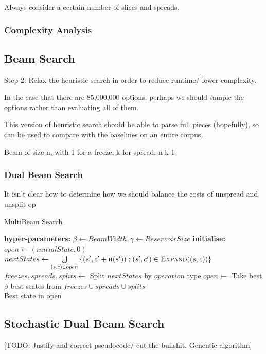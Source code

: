 \documentclass[12pt,a4paper,twoside,openany]{report} \usepackage[pdfborder={0 0 0}]{hyperref}    %
\theoremstyle{definition} \newtheorem{definition}{Definition}[section]
\begin{document}
    Always consider a certain number of slices and spreads.
    \subsubsection{Complexity Analysis}

    \subsection {Beam Search}
    Step 2: Relax the heuristic search in order to reduce runtime/ lower complexity. \par In
    the case that there are 85,000,000 options, perhaps we should sample the options rather than evaluating all of them.
    \par This version of heuristic search should be able to parse full pieces (hopefully), so can be used to compare
    with the baselines on an entire corpus. \par Beam of size n, with 1 for a freeze, k for spread, n-k-1 

    \subsubsection{Dual Beam Search} 
    It isn't clear how to determine how we should balance the costs of unspread and unsplit op

    \begin{algorithm}[ht] 
      \caption{MultiBeam Search} 
      \label{code:mbs} 
      \begin{algorithmic} 
        \State \textbf{hyper-parameters: } $\beta \gets BeamWidth, \gamma \gets ReservoirSize$ 
        \State \textbf{initialise: } $open \gets (initialState, 0)$  
        \State $nextStates \gets \bigcup\limits_{(s, c) \in open }\left\{ (s', c' + \Call{h}{s'}) : (s', c') \in \Call{Expand}{(s,c)} \right\}$ 
        \State $freezes, spreads, splits \gets $ Split $nextStates$ by $operation$ type 
        \State $open \gets $ Take best $\beta$ best states from $freezes \cup spreads \cup splits$ \EndWhile \\
        \Return Best state in open 
      \end{algorithmic} 
    \end{algorithm}

   \subsection{Stochastic Dual Beam Search} 
   [TODO: Justify and correct pseudocode/ cut the bullshit. Genentic algorithm]
\end{document}
